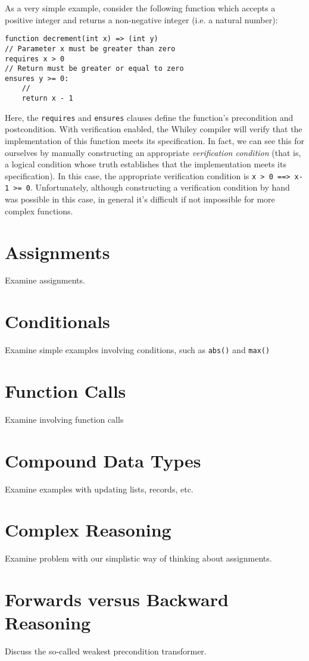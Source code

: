 As a very simple example, consider the following function which accepts a positive integer and returns a
non-negative integer (i.e. a natural number):
\begin{lstlisting}
function decrement(int x) => (int y) 
// Parameter x must be greater than zero
requires x > 0
// Return must be greater or equal to zero
ensures y >= 0:
    //
    return x - 1
\end{lstlisting}
Here, the \lstinline{requires} and \lstinline{ensures} clauses define
the function's precondition and postcondition.  With verification
enabled, the Whiley compiler will verify that the
implementation of this function meets its specification.  In fact, we
can see this for ourselves by manually constructing an appropriate
{\em verification condition} (that is, a logical condition whose truth
establishes that the implementation meets its specification).  In this
case, the appropriate verification condition is
 \lstinline{x > 0 ==> x-1 >= 0}.  Unfortunately, although constructing a verification
condition by hand was possible in this case, in general it's difficult
if not impossible for more complex functions.

\section{Assignments}

Examine assignments.

\section{Conditionals}
Examine simple examples involving conditions, such as \lstinline{abs()} and \lstinline{max()}

\section{Function Calls}
Examine involving function calls

\section{Compound Data Types}
Examine examples with updating lists, records, etc.

\section{Complex Reasoning}
Examine problem with our simplistic way of thinking about assignments.

\section{Forwards versus Backward Reasoning}
Discuss the so-called weakest precondition transformer.


